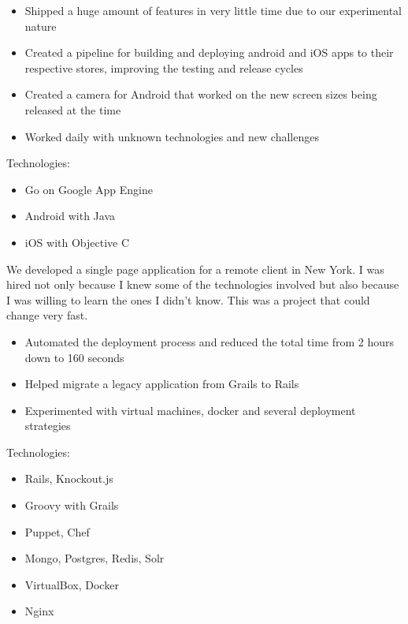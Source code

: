 \documentclass[10pt,a4paper,ragged2e,withhyper]{altacv}
\begin{document}
\begin{paracol}{2}
{\begin{itemize}
\item Shipped a huge amount of features in very little time due to our experimental nature
\item Created a pipeline for building and deploying android and iOS apps to their respective stores, improving the testing and release cycles
\item Created a camera for Android that worked on the new screen sizes being released at the time
\item Worked daily with unknown technologies and new challenges
\end{itemize}

Technologies:
\begin{itemize}
\item Go on Google App Engine
\item Android with Java
\item iOS with Objective C
\end{itemize}
}

\divider


{\RaggedRight
We developed a single page application for a remote client in New York. I was hired not only because I knew some of the technologies involved but also because I was willing to learn the ones I didn't know. This was a project that could change very fast.

\begin{itemize}
\item Automated the deployment process and reduced the total time from 2 hours down to 160 seconds
\item Helped migrate a legacy application from Grails to Rails
\item Experimented with virtual machines, docker and several deployment strategies
\end{itemize}

Technologies:
\begin{itemize}
\item Rails, Knockout.js
\item Groovy with Grails
\item Puppet, Chef
\item Mongo, Postgres, Redis, Solr
\item VirtualBox, Docker
\item Nginx
\end{itemize}
}


\end{paracol}
\end{document}
